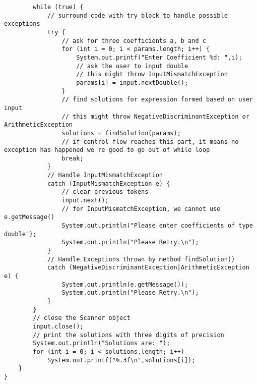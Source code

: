 \documentclass[12pt,letterpaper,twoside]{article}
\begin{document}
\begin{enumerate}
\begin{lstlisting}
		while (true) {
			// surround code with try block to handle possible exceptions
			try {
				// ask for three coefficients a, b and c
				for (int i = 0; i < params.length; i++) {
					System.out.printf("Enter Coefficient %d: ",i);
					// ask the user to input double
					// this might throw InputMismatchException
					params[i] = input.nextDouble();
				}
				// find solutions for expression formed based on user input
				// this might throw NegativeDiscriminantException or ArithmeticException
				solutions = findSolution(params);
				// if control flow reaches this part, it means no exception has happened we're good to go out of while loop
				break;
			}
			// Handle InputMismatchException
			catch (InputMismatchException e) {
				// clear previous tokens
				input.next();
				// for InputMismatchException, we cannot use e.getMessage()
				System.out.println("Please enter coefficients of type double");
				System.out.println("Please Retry.\n");
			}
			// Handle Exceptions thrown by method findSolution()
			catch (NegativeDiscriminantException|ArithmeticException e) {
				System.out.println(e.getMessage());
				System.out.println("Please Retry.\n");
			}
		}
		// close the Scanner object
		input.close();
		// print the solutions with three digits of precision
		System.out.println("Solutions are: ");
		for (int i = 0; i < solutions.length; i++)
			System.out.printf("%.3f\n",solutions[i]);
	}
}
\end{lstlisting}
\end{enumerate}
\end{document}
